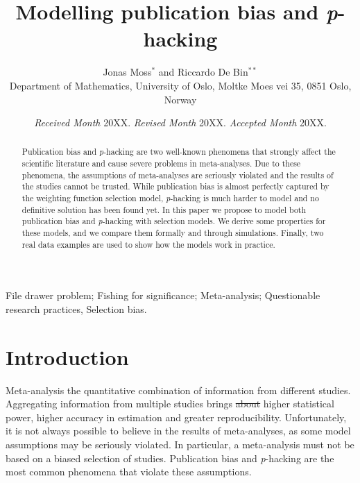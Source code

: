\documentclass[useAMS,usenatbib,referee]{biom}
\author{Jonas Moss$^{*}$\email{jonasmgj@math.uio.no} and
Riccardo De Bin$^{**}$\email{debin@math.uio.no}\\
Department of Mathematics, University of Oslo, Moltke Moes vei 35, 0851 Oslo, Norway}
\title[Modelling publication bias and \textit{p}-hacking]{Modelling publication bias and \textit{p}-hacking} %
\providecommand{\DIFaddtex}[1]{{\protect\color{green}\uwave{#1}}} %
\providecommand{\DIFdeltex}[1]{{\protect\color{red}\sout{#1}}}                      %
\providecommand{\DIFaddbegin}{} %
\providecommand{\DIFaddend}{} %
\providecommand{\DIFdelbegin}{} %
\providecommand{\DIFdelend}{} %
\providecommand{\DIFadd}[1]{\texorpdfstring{\DIFaddtex{#1}}{#1}} %
\providecommand{\DIFdel}[1]{\texorpdfstring{\DIFdeltex{#1}}{}} %
\begin{document}
\date{{\it Received Month} 20XX. {\it Revised Month} 20XX.  {\it Accepted Month} 20XX.}

\pagerange{\pageref{firstpage}--\pageref{lastpage}} 


\label{firstpage}

\begin{abstract}
Publication bias and \textit{p}-hacking are two well-known phenomena that strongly affect the scientific literature and cause severe problems in meta-analyses. Due to these phenomena, the assumptions of meta-analyses are seriously violated and the results of the studies cannot be trusted. While publication bias is almost perfectly captured by the weighting function selection model, \textit{p}-hacking is much harder to model and no definitive solution has been found yet. In this paper we propose to model both publication bias and \textit{p}-hacking with selection models. We derive some properties for these models, and we compare them formally and through simulations. Finally, two real data examples are used to show how the models work in practice.
\end{abstract}

\begin{keywords}
File drawer problem; Fishing for significance; Meta-analysis; Questionable research practices, Selection bias.
\end{keywords}

\maketitle

\section{Introduction}

Meta-analysis \DIFaddbegin \DIFadd{is }\DIFaddend the quantitative combination of information from different studies. Aggregating information from multiple studies brings \DIFdelbegin \DIFdel{about }\DIFdelend higher statistical power, higher accuracy in estimation and greater reproducibility. Unfortunately, it is not always possible to believe in the results of meta-analyses, as some model assumptions may be seriously violated. In particular, a meta-analysis must not be based on a biased selection of studies. Publication bias \citep{sterling1959publication} and \textit{p}-hacking \citep{simmons2011false} are the most common phenomena that violate these assumptions. 
\end{document}
